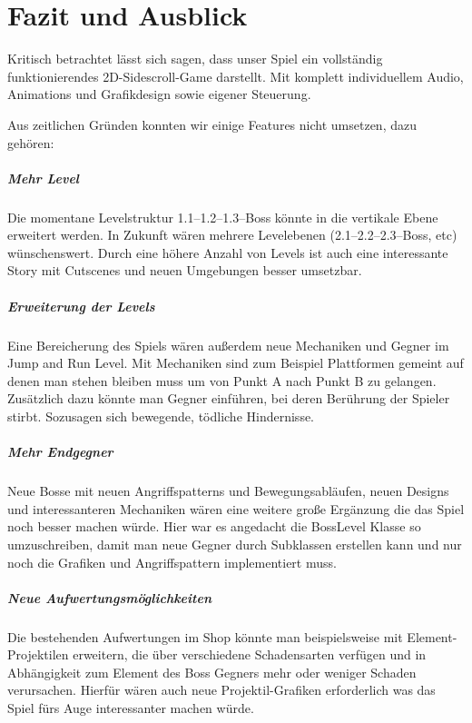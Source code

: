 \chapter{Fazit und Ausblick}\label{ch:fazit}

Kritisch betrachtet lässt sich sagen, dass unser Spiel ein vollständig funktionierendes 2D-Sidescroll-Game darstellt. Mit komplett individuellem Audio, Animations und Grafikdesign sowie eigener Steuerung. 

\label{sec:6_Features}

Aus zeitlichen Gründen konnten wir einige Features nicht umsetzen, dazu gehören:

\paragraph{Mehr Level}
Die momentane Levelstruktur 1.1--1.2--1.3--Boss könnte in die vertikale Ebene erweitert werden. In Zukunft wären mehrere Levelebenen (2.1--2.2--2.3--Boss, etc) wünschenswert. Durch eine höhere Anzahl von Levels ist auch eine interessante Story mit Cutscenes und neuen Umgebungen besser umsetzbar. 

\paragraph{Erweiterung der Levels}
Eine Bereicherung des Spiels wären außerdem neue Mechaniken und Gegner im Jump and Run Level. Mit Mechaniken sind zum Beispiel Plattformen gemeint auf denen man stehen bleiben muss um von Punkt A nach Punkt B zu gelangen. Zusätzlich dazu könnte man Gegner einführen, bei deren Berührung der Spieler stirbt. Sozusagen sich bewegende, tödliche Hindernisse.

\paragraph{Mehr Endgegner}
Neue Bosse mit neuen Angriffspatterns und Bewegungsabläufen, neuen Designs und interessanteren Mechaniken wären eine weitere große Ergänzung die das Spiel noch besser machen würde. Hier war es angedacht die BossLevel Klasse so umzuschreiben, damit man neue Gegner durch Subklassen erstellen kann und nur noch die Grafiken und Angriffspattern implementiert muss.

\paragraph{Neue Aufwertungsmöglichkeiten}
Die bestehenden Aufwertungen im Shop könnte man beispielsweise mit Element-Projektilen erweitern, die über verschiedene Schadensarten verfügen und in Abhängigkeit zum Element des Boss Gegners mehr oder weniger Schaden verursachen. Hierfür wären auch neue Projektil-Grafiken erforderlich was das Spiel fürs Auge interessanter machen würde.

